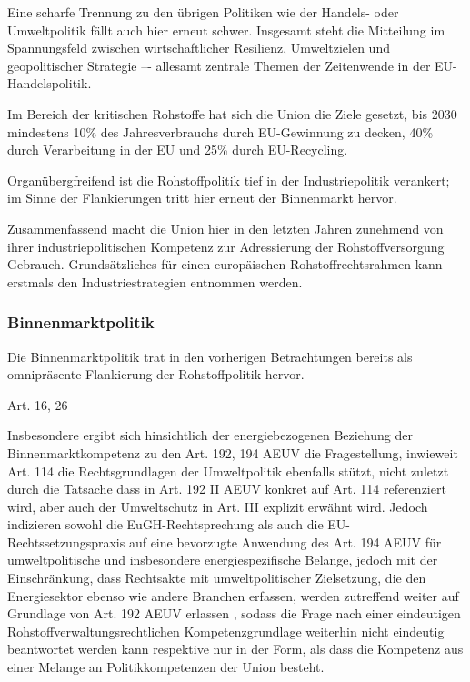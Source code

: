 \documentclass[12pt,a4paper,oneside]{book} %
\begin{document}
Eine scharfe Trennung zu den übrigen Politiken wie der Handels- oder Umweltpolitik fällt auch hier erneut schwer. Insgesamt steht die Mitteilung im Spannungsfeld zwischen wirtschaftlicher Resilienz, Umweltzielen und geopolitischer Strategie –- allesamt zentrale Themen der Zeitenwende in der EU-Handelspolitik.
	
Im Bereich der kritischen Rohstoffe hat sich die Union die Ziele gesetzt, bis 2030 mindestens 10\% des Jahresverbrauchs durch EU-Gewinnung zu decken, 40\% durch Verarbeitung in der EU und 25\% durch EU-Recycling.

Organübergfreifend ist die Rohstoffpolitik tief in der Industriepolitik verankert; im Sinne der Flankierungen tritt hier erneut der Binnenmarkt hervor.

Zusammenfassend macht die Union hier in den letzten Jahren zunehmend von ihrer industriepolitischen Kompetenz zur Adressierung der Rohstoffversorgung Gebrauch. Grundsätzliches für einen europäischen Rohstoffrechtsrahmen kann erstmals den Industriestrategien entnommen werden.
	
\subsubsection{Binnenmarktpolitik}
	
Die Binnenmarktpolitik trat in den vorherigen Betrachtungen bereits als omnipräsente Flankierung der Rohstoffpolitik hervor.

	Art. 16, 26
	
Insbesondere ergibt sich hinsichtlich der energiebezogenen Beziehung der Binnenmarktkompetenz zu den Art. 192, 194 AEUV die Fragestellung, inwieweit Art. 114 die Rechtsgrundlagen der Umweltpolitik ebenfalls stützt, nicht zuletzt durch die Tatsache dass in Art. 192 II AEUV konkret auf Art. 114 referenziert wird, aber auch der Umweltschutz in Art. III explizit erwähnt wird.\autocite[siehe insbesondere hierzu Gundel §m Rn 28f]{dauses_handbuch_2024} Jedoch indizieren sowohl die EuGH-Rechtsprechung als auch die EU-Rechtssetzungspraxis auf eine bevorzugte Anwendung des Art. 194 AEUV für umweltpolitische und insbesondere energiespezifische Belange, jedoch mit der Einschränkung, dass \glqq Rechtsakte mit umweltpolitischer Zielsetzung, die den Energiesektor ebenso wie andere Branchen erfassen, werden zutreffend weiter auf Grundlage von Art. 192 AEUV erlassen \grqq\autocite[Gundel §m Rn 29]{dauses_handbuch_2024}, sodass die Frage nach einer eindeutigen Rohstoffverwaltungsrechtlichen Kompetenzgrundlage weiterhin nicht eindeutig beantwortet werden kann respektive nur in der Form, als dass die Kompetenz aus einer Melange an Politikkompetenzen der Union besteht.
	
\end{document}
